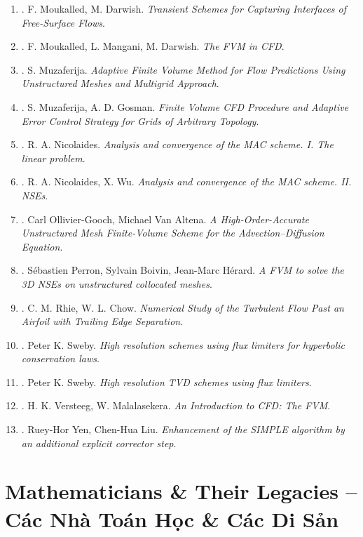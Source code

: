 \documentclass{article}
\begin{document}
\begin{enumerate}
	\item \cite{Moukalled_Darwish2012}. {\sc F. Moukalled, M. Darwish}. {\it Transient Schemes for Capturing Interfaces of Free-Surface Flows}.
	\item \cite{Moukalled_Mangani_Darwish2016}. {\sc F. Moukalled, L. Mangani, M. Darwish}. {\it The FVM in CFD}.
	\item \cite{Muzaferija1994}. {\sc S. Muzaferija}. {\it Adaptive Finite Volume Method for Flow Predictions Using Unstructured Meshes and Multigrid Approach}.
	\item \cite{Muzaferija_Gosman1997}. {\sc S. Muzaferija, A. D. Gosman}. {\it Finite Volume CFD Procedure and Adaptive Error Control Strategy for Grids of Arbitrary Topology}.
	\item \cite{Nicolaides1992}. {\sc R. A. Nicolaides}. {\it Analysis and convergence of the {MAC} scheme. I. The linear problem}.
	\item \cite{Nicolaides_Wu1996}. {\sc R. A. Nicolaides, X. Wu}. {\it Analysis and convergence of the MAC scheme. II. NSEs}.
	\item \cite{Ollivier-Gooch_Altena2002}. {\sc Carl Ollivier-Gooch, Michael Van Altena}. {\it A High-Order-Accurate Unstructured Mesh Finite-Volume Scheme for the Advection--Diffusion Equation}.
	\item \cite{Perron_Boivin_Herard2004}. {\sc S\'{e}bastien Perron, Sylvain Boivin, Jean-Marc H\'{e}rard}. {\it A FVM to solve the 3D NSEs on unstructured collocated meshes}.
	\item \cite{Rhie_Chow1983}. {\sc C. M. Rhie, W. L. Chow}. {\it Numerical Study of the Turbulent Flow Past an Airfoil with Trailing Edge Separation}.
	\item \cite{Sweby1984}. {\sc Peter K. Sweby}. {\it High resolution schemes using flux limiters for hyperbolic conservation laws}.
	\item \cite{Sweby1985}. {\sc Peter K. Sweby}. {\it High resolution TVD schemes using flux limiters}.
	\item \cite{Versteeg_Malalasekera2007}. {\sc H. K. Versteeg, W. Malalasekera}. {\it An Introduction to CFD: The FVM}.
	\item \cite{Yen_Liu1993}. {\sc Ruey-Hor Yen, Chen-Hua Liu}. {\it Enhancement of the SIMPLE algorithm by an additional explicit corrector step}.
\end{enumerate}


\section{Mathematicians \& Their Legacies -- Các Nhà Toán Học \& Các Di Sản}
\end{document}
